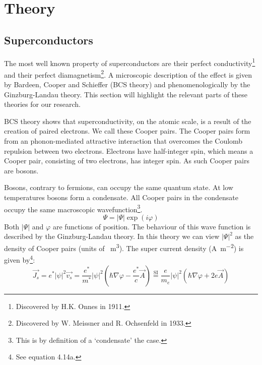 \chapter{Theory}
\section{Superconductors}
The most well known property of superconductors are their perfect conductivity\footnote{Discovered by H.K. Onnes in 1911.} and their perfect diamagnetism\footnote{Discovered by W. Meissner and R. Ochsenfeld in 1933.}. A microscopic description of the effect is given by Bardeen, Cooper and Schieffer (BCS theory) and phenomenologically by the Ginzburg-Landau theory.\cite{tinkhamIntroductionSuperconductivity} This section will highlight the relevant parts of these theories for our research.

BCS theory shows that superconductivity, on the atomic scale, is a result of the creation of paired electrons. We call these Cooper pairs. The Cooper pairs form from an phonon-mediated attractive interaction that overcomes the Coulomb repulsion between two electrons.\cite{bardeenTheorySuperconductivity1957} Electrons have half-integer spin, which means a Cooper pair, consisting of two electrons, has integer spin. As such Cooper pairs are bosons.

Bosons, contrary to fermions, can occupy the same quantum state. At low temperatures bosons form a condensate. All Cooper pairs in the condensate occupy the same macroscopic wavefunction\footnote{This is by definition of a `condensate' the case.}.
\begin{equation}
	\Psi = \left|\Psi\right| \exp(i\varphi)
	\label{eqn:GL-wavefunction}
\end{equation}
Both $\left|\Psi\right|$ and $\varphi$ are functions of position. The behaviour of this wave function is described by the Ginzburg-Landau theory. In this theory we can view $|\Psi|^2$ as the density of Cooper pairs (units of \unit{\per\cubic\meter}). The super current density (\unit{\ampere\per\square\meter}) is given by\footnote{See  equation 4.14a.}:
\begin{equation}
	\vec{J_s} = e^* |\psi|^2 \vec{v_s} = \frac{e^*}{m^*} |\psi|^2 \left(\hbar \nabla \varphi-\frac{e^*}{c} \vec{A}\right) \stackrel{\text{SI}}{=} \frac{e}{m_e} |\psi|^2 \left(\hbar \nabla \varphi + 2e \vec{A}\right)
	\label{eqn:super-current}
\end{equation}

